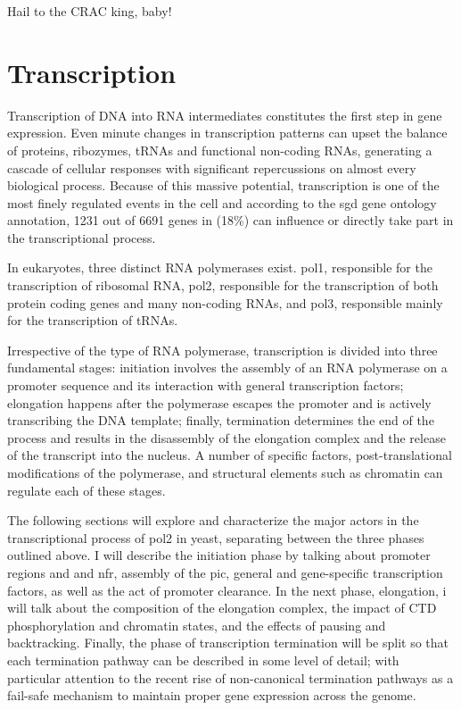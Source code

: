 \begin{savequote}[70mm]
Hail to the CRAC king, baby!
\end{savequote}

\chapter{Transcription}

Transcription of DNA into RNA intermediates constitutes the first step in gene expression.
Even minute changes in transcription patterns can upset the balance of proteins, ribozymes, tRNAs and functional non-coding RNAs, generating a cascade of cellular responses with  significant repercussions on almost every biological process.
Because of this massive potential, transcription is one of the most finely regulated events in the cell and according to the \gls{sgd} \cite{cherry:2012:saccharomyces} gene ontology annotation, 1231 out of 6691 genes in \cer (18\%) can influence or directly take part in the transcriptional process.

In eukaryotes, three distinct RNA polymerases exist. \gls{pol1}, responsible for the transcription of ribosomal RNA, \gls{pol2}, responsible for the transcription of both protein coding genes and many non-coding RNAs, and \gls{pol3}, responsible mainly for the transcription of tRNAs. 

Irrespective of the type of RNA polymerase, transcription is divided into three fundamental stages: initiation involves the assembly of an RNA polymerase on a promoter sequence and its interaction with general transcription factors; elongation happens after the polymerase escapes the promoter and is actively transcribing the DNA template; finally, termination determines the end of the process and results in the disassembly of the elongation complex and the release of the transcript into the nucleus. 
A number of specific factors, post-translational modifications of the polymerase, and structural elements such as chromatin can regulate each of these stages.

The following sections will explore and characterize the major actors in the transcriptional process of \gls{pol2} in yeast, separating between the three phases outlined above.
I will describe the initiation phase by talking about promoter regions and and \gls{nfr}, assembly of the \gls{pic}, general and gene-specific transcription factors, as well as the act of promoter clearance.
In the next phase, elongation, i will talk about the composition of the elongation complex, the impact of  CTD phosphorylation and chromatin states, and the effects of pausing and backtracking.
Finally, the phase of transcription termination will be split so that each termination pathway can be described in some level of detail; with particular attention to the recent rise of non-canonical termination pathways as a fail-safe mechanism to maintain proper gene expression across the genome.   

